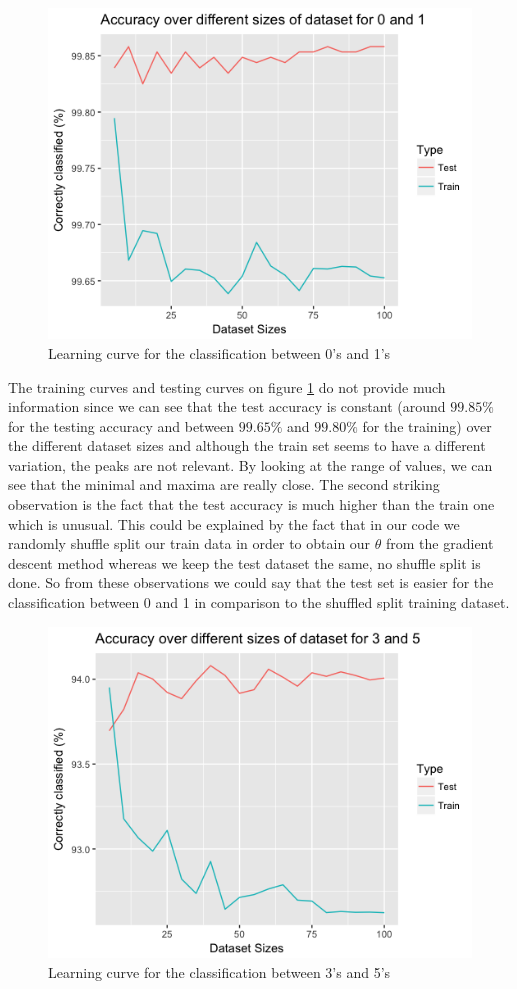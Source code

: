 \documentclass[a4paper,11pt]{article}
\begin{document}
\begin{figure}[H]
\centering
\includegraphics[width=.6\textwidth]{0_1_accuracy}
\caption{Learning curve for the classification between 0's and 1's}
\label{0_1_accuracy}
\end{figure}

The training curves and testing curves on figure \ref{0_1_accuracy} do not provide much information since we can see that the test accuracy is constant (around $99.85\%$ for the testing accuracy and  between $99.65\%$ and $99.80\%$ for the training) over the different dataset sizes and although the train set seems to have a different variation, the peaks are not relevant. By looking at the range of values, we can see that the minimal and maxima are really close. The second striking observation is the fact that the test accuracy is much higher than the train one which is unusual. This could be explained by the fact that in our code we randomly shuffle split our train data in order to obtain our $\theta$ from the gradient descent method whereas we keep the test dataset the same, no shuffle split is done. So from these observations we could say that the test set is easier for the classification between 0 and 1 in comparison to the shuffled split training dataset.

\begin{figure}[H]
\centering
\includegraphics[width=.6\textwidth]{3_5_accuracy}
\caption{Learning curve for the classification between 3's and 5's}
\label{3_5_accuracy}
\end{figure}
\end{document}
